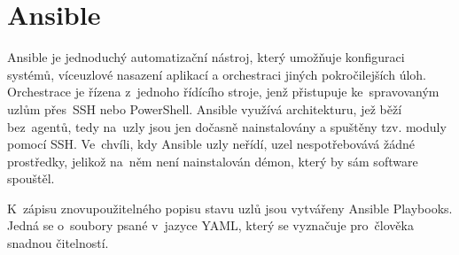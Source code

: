 \newpage
\section{Ansible}
\label{ansible}  
Ansible je jednoduchý automatizační nástroj, který umožňuje
konfiguraci systémů, víceuzlové nasazení aplikací a orchestraci jiných
pokročilejších úloh. Orchestrace je řízena z~jednoho řídícího stroje,
jenž přistupuje ke~spravovaným uzlům přes~SSH nebo PowerShell. Ansible
využívá architekturu, jež běží bez~agentů, tedy na~uzly jsou jen
dočasně nainstalovány a spuštěny tzv. moduly pomocí SSH. Ve~chvíli,
kdy Ansible uzly neřídí, uzel nespotřebovává žádné prostředky, jelikož
na~něm není nainstalován démon, který by sám software spouštěl. \cite{ansible-doc}

K~zápisu znovupoužitelného popisu stavu uzlů jsou vytvářeny Ansible
Playbooks. Jedná se o~soubory psané v~jazyce YAML, který se vyznačuje
pro~člověka snadnou čitelností.
